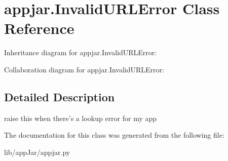 \hypertarget{classappjar_1_1_invalid_u_r_l_error}{}\section{appjar.\+Invalid\+U\+R\+L\+Error Class Reference}
\label{classappjar_1_1_invalid_u_r_l_error}


Inheritance diagram for appjar.\+Invalid\+U\+R\+L\+Error\+:


Collaboration diagram for appjar.\+Invalid\+U\+R\+L\+Error\+:


\subsection{Detailed Description}
\begin{DoxyVerb}raise this when there's a lookup error for my app\end{DoxyVerb}
 

The documentation for this class was generated from the following file\+:\begin{DoxyCompactItemize}
\item 
lib/app\+Jar/appjar.\+py\end{DoxyCompactItemize}
